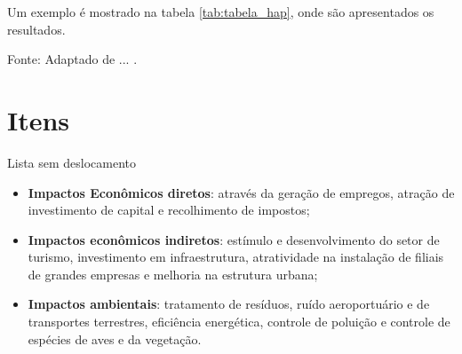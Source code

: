 Um exemplo é mostrado na tabela \ref{tab:tabela_hap}, onde são apresentados os resultados.
\begin{table}[H] 
\centering
\caption{\%HAP segundo diversos Autores e agências ambientais}
\label{tab:tabela_hap}
Fonte: Adaptado de ... .
\end{table}

\section{Itens}

Lista sem deslocamento

\begin{itemize}
        \item {\bf Impactos Econômicos diretos}: através da geração de empregos, atração de investimento de capital e recolhimento de impostos;
        \item {\bf Impactos econômicos indiretos}: estímulo e desenvolvimento do setor de turismo, investimento em infraestrutura, atratividade na instalação de filiais de grandes empresas e melhoria na estrutura urbana;
        \item {\bf Impactos ambientais}: tratamento de resíduos, ruído aeroportuário e de transportes terrestres, eficiência energética, controle de poluição e controle de espécies de aves e da vegetação.
\end{itemize}

